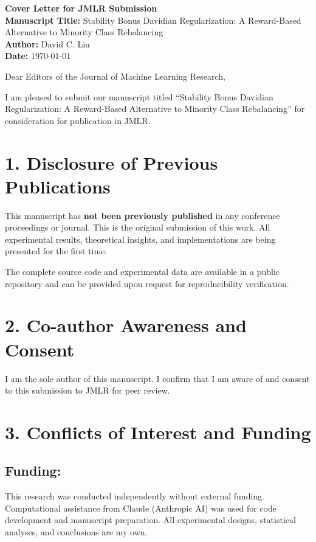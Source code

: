 \documentclass[11pt]{article}
\begin{document}
\noindent
\textbf{Cover Letter for JMLR Submission}\\
\textbf{Manuscript Title:} Stability Bonus Davidian Regularization: A Reward-Based Alternative to Minority Class Rebalancing\\
\textbf{Author:} David C. Liu\\
\textbf{Date:} \today

\vspace{1em}

Dear Editors of the Journal of Machine Learning Research,

I am pleased to submit our manuscript titled ``Stability Bonus Davidian Regularization: A Reward-Based Alternative to Minority Class Rebalancing'' for consideration for publication in JMLR.

\section*{1. Disclosure of Previous Publications}

This manuscript has \textbf{not been previously published} in any conference proceedings or journal. This is the original submission of this work. All experimental results, theoretical insights, and implementations are being presented for the first time.

The complete source code and experimental data are available in a public repository and can be provided upon request for reproducibility verification.

\section*{2. Co-author Awareness and Consent}

I am the sole author of this manuscript. I confirm that I am aware of and consent to this submission to JMLR for peer review.

\section*{3. Conflicts of Interest and Funding}

\subsection*{Funding:}
This research was conducted independently without external funding. Computational assistance from Claude (Anthropic AI) was used for code development and manuscript preparation. All experimental designs, statistical analyses, and conclusions are my own.
\end{document}
